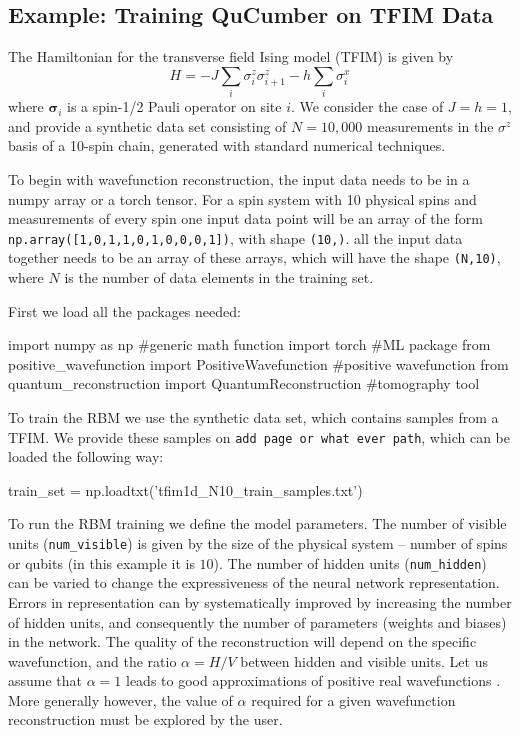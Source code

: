 \documentclass[submission, Phys]{SciPost}
\begin{document}
\subsection{Example: Training QuCumber on TFIM Data}
\label{Sec:Training_TFIM}

The Hamiltonian for the transverse field Ising model (TFIM) is given by 
\begin{equation}
H = -J\sum_i {\sigma}^z_i {\sigma}^z_{i+1} - h \sum_i {\sigma}^x_{i} \label{TFIM}
\end{equation}
where ${\bm \sigma}_i$ is a spin-1/2 Pauli operator on site $i$.  We consider the case of $J=h=1$, and provide a synthetic data set consisting of  $N=10,000$ measurements in the $\sigma^z$ basis of a 10-spin chain, generated with standard numerical techniques.

To begin with wavefunction reconstruction, the input data needs to be in a numpy array or a torch tensor. For a spin system with 10 physical spins and measurements of every spin one input data point will be an array of the form \verb|np.array([1,0,1,1,0,1,0,0,0,1])|, with shape \verb|(10,)|. all the input data together needs to be an array of these arrays, which will have the shape \verb|(N,10)|, where $N$ is the number of data elements in the training set.

First we load all the packages needed:
\begin{python}
import numpy as np 		#generic math function
import torch 			#ML package
from positive_wavefunction import PositiveWavefunction #positive wavefunction
from quantum_reconstruction import QuantumReconstruction #tomography tool
\end{python} 

To train the RBM we use the synthetic data set, which contains samples from a TFIM. We provide these samples on \verb|add page or what ever path|, which can be loaded the following way:

\begin{python}
train_set =  np.loadtxt('tfim1d_N10_train_samples.txt')
\end{python}

To run the RBM training we define the model parameters. The number of visible units (\verb|num_visible|) is given by the size of the physical system -- number of spins or qubits (in this example it is $10$). 
The number of hidden units (\verb|num_hidden|) can be varied to change the expressiveness of the neural network representation.
Errors in representation can by systematically improved by increasing the number of hidden units, and consequently the number of  parameters (weights and biases) in the network.
The quality of the reconstruction will depend on the specific wavefunction, 
and the ratio $\alpha = H/V$ between hidden and visible units. 
Let us assume that $\alpha = 1$ leads to good approximations of positive real wavefunctions \cite{Torlai2016thermo}.  
More generally however, the value of $\alpha$ required for a given wavefunction reconstruction must be explored by the user.
\end{document}
